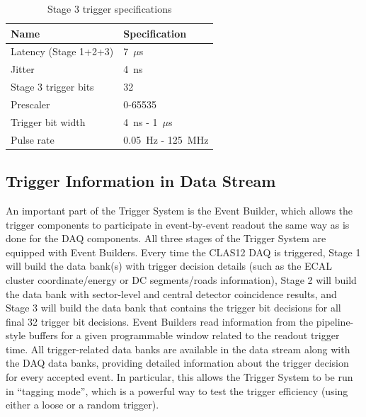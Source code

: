 \begin{table}
\begin{center}
	\begin{tabular}{| l | l |}
		\hline \hline
		Name				& Specification	\\
		\hline
		Latency (Stage 1+2+3)		& 7~$\mu$s	\\
		Jitter				& 4~ns		\\
		Stage 3 trigger bits		& 32		\\
		Prescaler			& 0-65535	\\
		Trigger bit width		& 4~ns - 1~$\mu$s	\\
		Pulse rate			& 0.05~Hz - 125~MHz	\\
		\hline \hline
	\end{tabular}
\end{center}
\caption{Stage 3 trigger specifications}
\label{tab:stage_3_specs}
\end{table}


\subsection{Trigger Information in Data Stream}
\label{sec:trigger_in_datastream}

An important part of the Trigger System is the Event Builder, which allows the trigger components to participate in event-by-event readout the same way as is done for the DAQ components. All three stages of the Trigger System are equipped with Event Builders. Every time the CLAS12 DAQ is triggered, Stage 1 will build the data bank(s) with trigger decision details (such as the ECAL cluster coordinate/energy or DC segments/roads information), Stage 2 will build the data bank with sector-level and central detector coincidence results, and Stage 3 will build the data bank that contains the trigger bit decisions for all final 32 trigger bit decisions. Event Builders read information from the pipeline-style buffers for a given programmable window related to the readout trigger time. All trigger-related data banks are available in the data stream along with the DAQ data banks, providing detailed information about the trigger decision for every accepted event. In particular, this allows the Trigger System to be run in ``tagging mode'', which is a powerful way to test the trigger efficiency (using either a loose or a random trigger).


